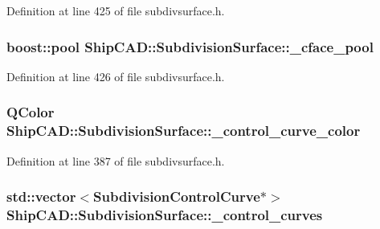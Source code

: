 Definition at line 425 of file subdivsurface.\-h.

\hypertarget{classShipCAD_1_1SubdivisionSurface_a6bb58101a0ee9c4f06e1fdf86f0cded1}{
\subsubsection[{\-\_\-cface\-\_\-pool}]{\setlength{\rightskip}{0pt plus 5cm}boost\-::pool Ship\-C\-A\-D\-::\-Subdivision\-Surface\-::\-\_\-cface\-\_\-pool\hspace{0.3cm}{\ttfamily [protected]}}}\label{classShipCAD_1_1SubdivisionSurface_a6bb58101a0ee9c4f06e1fdf86f0cded1}


Definition at line 426 of file subdivsurface.\-h.

\hypertarget{classShipCAD_1_1SubdivisionSurface_af0385bc183e805c1adc23750747a43d7}{
\subsubsection[{\-\_\-control\-\_\-curve\-\_\-color}]{\setlength{\rightskip}{0pt plus 5cm}Q\-Color Ship\-C\-A\-D\-::\-Subdivision\-Surface\-::\-\_\-control\-\_\-curve\-\_\-color\hspace{0.3cm}{\ttfamily [protected]}}}\label{classShipCAD_1_1SubdivisionSurface_af0385bc183e805c1adc23750747a43d7}


Definition at line 387 of file subdivsurface.\-h.

\hypertarget{classShipCAD_1_1SubdivisionSurface_a72da0f8a60e186e10b88f48950a490e9}{
\subsubsection[{\-\_\-control\-\_\-curves}]{\setlength{\rightskip}{0pt plus 5cm}std\-::vector$<${\bf Subdivision\-Control\-Curve}$\ast$$>$ Ship\-C\-A\-D\-::\-Subdivision\-Surface\-::\-\_\-control\-\_\-curves\hspace{0.3cm}{\ttfamily [protected]}}}\label{classShipCAD_1_1SubdivisionSurface_a72da0f8a60e186e10b88f48950a490e9}


